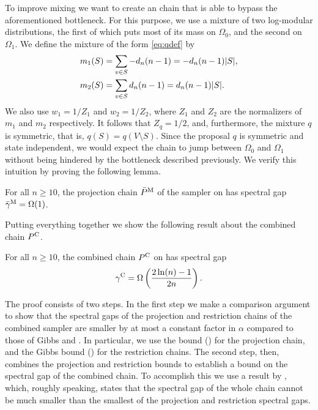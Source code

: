 To improve mixing we want to create an \Ms{} chain that is able to bypass the aforementioned bottleneck.
For this purpose, we use a mixture of two log-modular distributions, the first of which puts most of its mass on $\Omega_0$, and the second on $\Omega_1$.
We define the mixture of the form \eqref{eq:qdef} by
\begin{align*}
  m_1(S) &= \sum_{v \in S} -d_n (n-1) = -d_n (n-1) |S|,\\
  m_2(S) &= \sum_{v \in S} d_n (n-1) = d_n (n-1) |S|.
\end{align*}
We also use $w_1 = 1 / Z_1$ and $w_2 = 1 / Z_2$, where $Z_1$ and $Z_2$ are the normalizers of $m_1$ and $m_2$ respectively.
It follows that $Z_q = 1 / 2$, and, furthermore, the mixture $q$ is symmetric, that is, $q(S) = q(V \setminus S)$.
Since the proposal $q$ is symmetric and state independent, we would expect the \Ms{} chain to jump between $\Omega_0$ and $\Omega_1$ without being hindered by the bottleneck described previously.
We verify this intuition by proving the following lemma.
\begin{lemma} \label{lem:mproj}
  For all $n \geq 10$, the projection chain $\bar{P}^{\mathrm{M}}$ of the \Ms{} sampler on \ising{} has spectral gap $\bar{\gamma}^{\mathrm{M}} = \Omega(1)$.
\end{lemma}

Putting everything together we show the following result about the combined chain $P^{\mathrm{C}}$.
\begin{theorem}
  For all $n \geq 10$, the combined chain $P^{\mathrm{C}}$ on \ising{} has spectral gap
  \begin{align*}
    \gamma^{\mathrm{C}} = \Omega\left( \displaystyle\frac{2\ln(n) - 1}{2n} \right).
  \end{align*}
\end{theorem}
The proof consists of two steps.
In the first step we make a comparison argument \citep{diaconis93,levin08book} to show that the spectral gaps of the projection and restriction chains of the combined sampler are smaller by at most a constant factor in $\alpha$ compared to those of Gibbs and \Ms{}.
In particular, we use the \Ms{} bound () for the projection chain, and the Gibbs bound () for the restriction chains.
The second step, then, combines the projection and restriction bounds to establish a bound on the spectral gap of the combined chain.
To accomplish this we use a result by \cite{jerrum04poincare}, which, roughly speaking, states that the spectral gap of the whole chain cannot be much smaller than the smallest of the projection and restriction spectral gaps.

